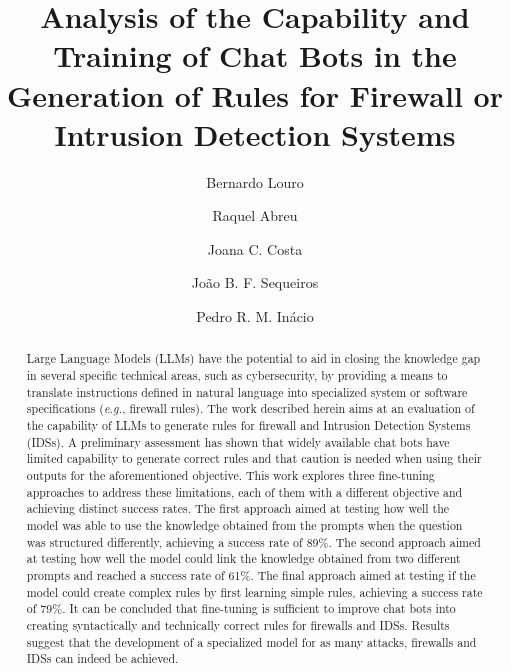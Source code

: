 \documentclass[sigconf]{acmart}
\begin{document}
\title{Analysis of the Capability and Training of Chat Bots in the Generation of Rules for Firewall or Intrusion Detection Systems}

\author{Bernardo Louro}

\author{Raquel Abreu}

\author{Joana C. Costa}

\author{João B. F. Sequeiros}

\author{Pedro R. M. Inácio}


\renewcommand{\shortauthors}{Louro et al.}

\begin{abstract}
Large Language Models (LLMs) have the potential to aid in closing the knowledge gap in several specific technical areas, such as cybersecurity, by providing a means to translate instructions defined in natural language into specialized system or software specifications (\textit{e.g.}, firewall rules). The work described herein aims at an evaluation of the capability of LLMs to generate rules for firewall and Intrusion Detection Systems (IDSs). A preliminary assessment has shown that widely available chat bots have limited capability to generate correct rules and that caution is needed when using their outputs for the aforementioned objective. This work explores three fine-tuning approaches to address these limitations, each of them with a different objective and achieving distinct success rates. The first approach aimed at testing how well the model was able to use the knowledge obtained from the prompts when the question was structured differently, achieving a success rate of 89\%. The second approach aimed at testing how well the model could link the knowledge obtained from two different prompts and reached a success rate of 61\%. The final approach aimed at testing if the model could create complex rules by first learning simple rules, achieving a success rate of 79\%. It can be concluded that fine-tuning is sufficient to improve chat bots into creating syntactically and technically correct rules for firewalls and IDSs. Results suggest that the development of a specialized model for as many attacks, firewalls and IDSs can indeed be achieved.
\end{abstract}
\end{document}
